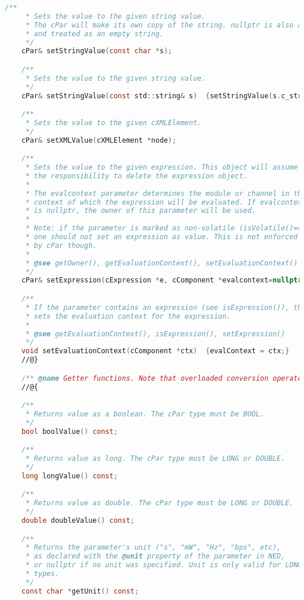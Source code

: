 \begin{lstlisting}[language=c]
    /**
     * Sets the value to the given string value.
     * The cPar will make its own copy of the string. nullptr is also accepted
     * and treated as an empty string.
     */
    cPar& setStringValue(const char *s);

    /**
     * Sets the value to the given string value.
     */
    cPar& setStringValue(const std::string& s)  {setStringValue(s.c_str()); return *this;}

    /**
     * Sets the value to the given cXMLElement.
     */
    cPar& setXMLValue(cXMLElement *node);

    /**
     * Sets the value to the given expression. This object will assume
     * the responsibility to delete the expression object.
     *
     * The evalcontext parameter determines the module or channel in the
     * context of which the expression will be evaluated. If evalcontext
     * is nullptr, the owner of this parameter will be used.
     *
     * Note: if the parameter is marked as non-volatile (isVolatile()==false),
     * one should not set an expression as value. This is not enforced
     * by cPar though.
     *
     * @see getOwner(), getEvaluationContext(), setEvaluationContext()
     */
    cPar& setExpression(cExpression *e, cComponent *evalcontext=nullptr);

    /**
     * If the parameter contains an expression (see isExpression()), this method
     * sets the evaluation context for the expression.
     *
     * @see getEvaluationContext(), isExpression(), setExpression()
     */
    void setEvaluationContext(cComponent *ctx)  {evalContext = ctx;}
    //@}

    /** @name Getter functions. Note that overloaded conversion operators also exist. */
    //@{

    /**
     * Returns value as a boolean. The cPar type must be BOOL.
     */
    bool boolValue() const;

    /**
     * Returns value as long. The cPar type must be LONG or DOUBLE.
     */
    long longValue() const;

    /**
     * Returns value as double. The cPar type must be LONG or DOUBLE.
     */
    double doubleValue() const;

    /**
     * Returns the parameter's unit ("s", "mW", "Hz", "bps", etc),
     * as declared with the @unit property of the parameter in NED,
     * or nullptr if no unit was specified. Unit is only valid for LONG and DOUBLE
     * types.
     */
    const char *getUnit() const;


\end{lstlisting}
